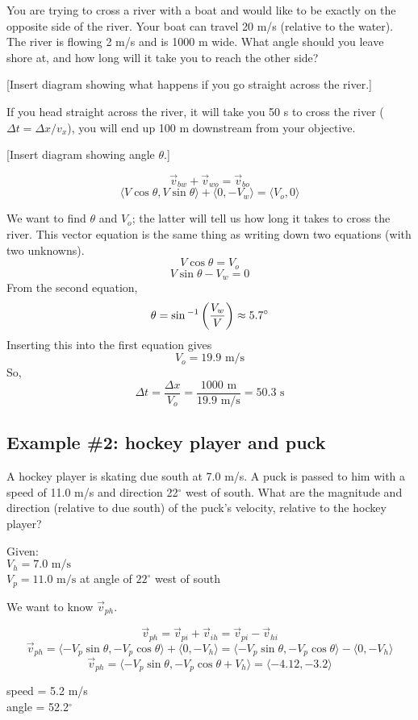 You are trying to cross a river with a boat and would like to be exactly on the opposite side of the river. Your boat can travel 20 m/s (relative to the water). The river is flowing 2 m/s and is 1000 m wide. What angle should you leave shore at, and how long will it take you to reach the other side?

[Insert diagram showing what happens if you go straight across the river.]
\vspace{4cm}

If you head straight across the river, it will take you 50 s to cross the river ($\Delta{t}=\Delta{x}/v_x$), you will end up 100 m downstream from your objective.

[Insert diagram showing angle $\theta$.]
\vspace{4cm}

$$\vec{v}_{bw}+\vec{v}_{wo}=\vec{v}_{bo}$$
$$\langle{V\cos\theta,V\sin\theta}\rangle+\langle{0,-V_w}\rangle=\langle{V_o,0}\rangle$$

We want to find $\theta$ and $V_o$; the latter will tell us how long it takes to cross the river. This vector equation is the same thing as writing down two equations (with two unknowns).
$$V\cos\theta=V_o$$
$$V\sin\theta-V_w=0$$
From the second equation,
$$\theta=\sin\displaystyle^{-1}\left(\frac{V_w}{V}\right)\approx 5.7^\circ$$
Inserting this into the first equation gives
$$V_o=19.9\mbox{ m/s}$$
So,
$$\Delta{t}=\frac{\Delta{x}}{V_o}=\frac{1000\mbox{ m}}{19.9 \mbox{ m/s}}=50.3\mbox{ s}$$

\subsection{Example \#2: hockey player and puck}
A hockey player is skating due south at 7.0 m/s. A puck is passed to him with a speed of 11.0 m/s and direction 22$^\circ$ west of south. What are the magnitude and direction (relative to due south) of the puck's velocity, relative to the hockey player?

Given:\\
$V_h=7.0\mbox{ m/s}$\\
$V_p=11.0\mbox{ m/s}$ at angle of $22^\circ$ west of south

We want to know $\vec{v}_{ph}$.

$$\vec{v}_{ph}=\vec{v}_{pi}+\vec{v}_{ih}=\vec{v}_{pi}-\vec{v}_{hi}$$
$$\vec{v}_{ph}=\langle{-V_p\sin\theta,-V_p\cos\theta}\rangle+\langle{0,-V_h}\rangle=\langle{-V_p\sin\theta,-V_p\cos\theta}\rangle-\langle{0,-V_h}\rangle$$
$$\vec{v}_{ph}=\langle{-V_p\sin\theta,-V_p\cos\theta+V_h}\rangle=\langle{-4.12,-3.2}\rangle$$

speed = 5.2 m/s\\
angle = 52.2$^\circ$ 

\clearpage
